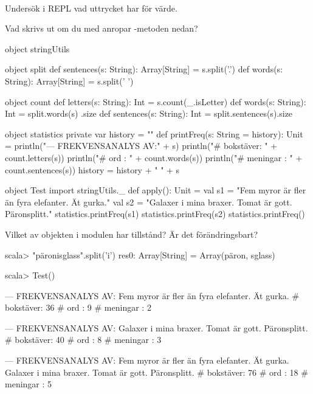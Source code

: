 \clearpage

\ExtraTasks %




\QUESTBEGIN

\Task  \what~

\Subtask Undersök i REPL vad uttrycket  har för värde.

\Subtask Vad skrivs ut om du med  anropar -metoden nedan?
\begin{Code}
object stringUtils {
  object split {
    def sentences(s: String): Array[String] = s.split('.')
    def words(s: String):     Array[String] = s.split(' ')
  }

  object count {
    def letters(s: String):   Int = s.count(_.isLetter)
    def words(s: String):     Int = split.words(s)    .size
    def sentences(s: String): Int = split.sentences(s).size
  }

  object statistics {
    private var history = ""
    def printFreq(s: String = history): Unit = {
      println("\n--- FREKVENSANALYS AV:\n" + s)
      println("# bokstäver: " + count.letters(s))
      println("# ord      : " + count.words(s))
      println("# meningar : " + count.sentences(s))
      history = history + " " + s
    }
  }
}

object Test {
  import stringUtils._
  def apply(): Unit = {
    val s1 = "Fem myror är fler än fyra elefanter. Ät gurka."
    val s2 = "Galaxer i mina braxer. Tomat är gott. Päronsplitt."
    statistics.printFreq(s1)
    statistics.printFreq(s2)
    statistics.printFreq()
  }
}
\end{Code}

\Subtask Vilket av objekten i modulen  har tillstånd? Är det förändringsbart?


\SOLUTION


\TaskSolved \what

\SubtaskSolved
\begin{REPLnonum}
scala> "päronisglass".split('i')
res0: Array[String] = Array(päron, sglass)
\end{REPLnonum}

\SubtaskSolved
\begin{REPLnonum}
scala> Test()

--- FREKVENSANALYS AV:
Fem myror är fler än fyra elefanter. Ät gurka.
# bokstäver: 36
# ord      : 9
# meningar : 2

--- FREKVENSANALYS AV:
Galaxer i mina braxer. Tomat är gott. Päronsplitt.
# bokstäver: 40
# ord      : 8
# meningar : 3

--- FREKVENSANALYS AV:
 Fem myror är fler än fyra elefanter. Ät gurka. Galaxer i mina
 braxer. Tomat är gott. Päronsplitt.
# bokstäver: 76
# ord      : 18
# meningar : 5

\end{REPLnonum}

